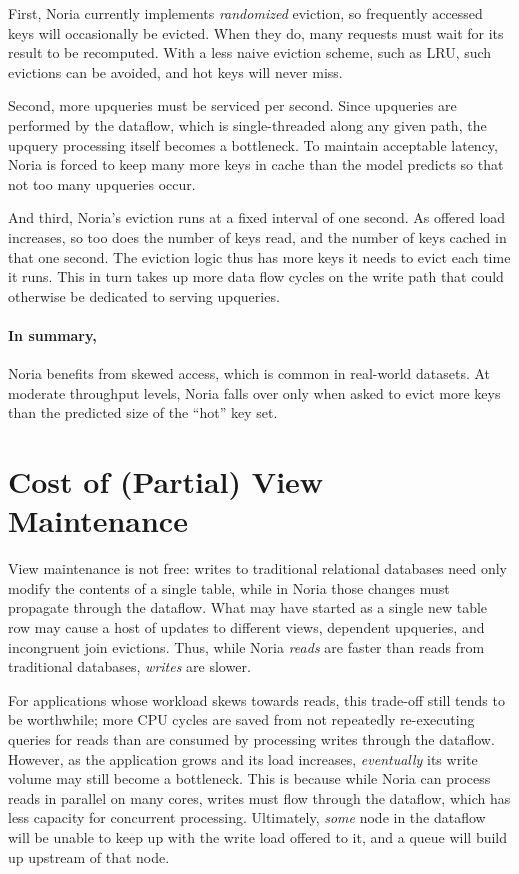 First, Noria currently implements \emph{randomized} eviction, so frequently
accessed keys will occasionally be evicted. When they do, many requests must
wait for its result to be recomputed. With a less naive eviction scheme, such as
LRU, such evictions can be avoided, and hot keys will never miss.

Second, more upqueries must be serviced per second. Since upqueries are
performed by the dataflow, which is single-threaded along any given path, the
upquery processing itself becomes a bottleneck. To maintain acceptable latency,
Noria is forced to keep many more keys in cache than the model predicts so that
not too many upqueries occur.

And third, Noria's eviction runs at a fixed interval of one second. As offered
load increases, so too does the number of keys read, and the number of keys
cached in that one second. The eviction logic thus has more keys it needs to
evict each time it runs. This in turn takes up more data flow cycles on the
write path that could otherwise be dedicated to serving upqueries.

\paragraph{In summary,} Noria benefits from skewed access, which is common in
real-world datasets. At moderate throughput levels, Noria falls over only when
asked to evict more keys than the predicted size of the ``hot'' key set.

\section{Cost of (Partial) View Maintenance}

View maintenance is not free: writes to traditional relational databases need
only modify the contents of a single table, while in Noria those changes must
propagate through the dataflow. What may have started as a single new table row
may cause a host of updates to different views, dependent upqueries, and
incongruent join evictions. Thus, while Noria \emph{reads} are faster than reads
from traditional databases, \emph{writes} are slower.

For applications whose workload skews towards reads, this trade-off still tends
to be worthwhile; more CPU cycles are saved from not repeatedly re-executing
queries for reads than are consumed by processing writes through the dataflow.
However, as the application grows and its load increases, \emph{eventually} its
write volume may still become a bottleneck. This is because while Noria can
process reads in parallel on many cores, writes must flow through the dataflow,
which has less capacity for concurrent processing. Ultimately, \emph{some} node
in the dataflow will be unable to keep up with the write load offered to it, and
a queue will build up upstream of that node.

